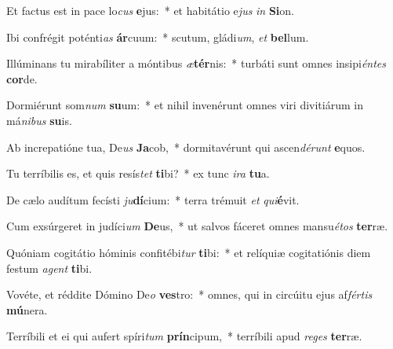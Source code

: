 \item Et factus est in pace lo\textit{cus} \textbf{e}jus:~* et habitátio e\textit{jus} \textit{in} \textbf{Si}on.
\item Ibi confrégit poténti\textit{as} \textbf{ár}cuum:~* scutum, gládi\textit{um}, \textit{et} \textbf{bel}lum.
\item Illúminans tu mirabíliter a móntibus \textit{æ}\textbf{tér}nis:~* turbáti sunt omnes insipi\textit{én}\textit{tes} \textbf{cor}de.
\item Dormiérunt som\textit{num} \textbf{su}um:~* et nihil invenérunt omnes viri divitiárum in má\textit{ni}\textit{bus} \textbf{su}is.
\item Ab increpatióne tua, De\textit{us} \textbf{Ja}cob,~* dormitavérunt qui ascen\textit{dé}\textit{runt} \textbf{e}quos.
\item Tu terríbilis es, et quis resís\textit{tet} \textbf{ti}bi?~* ex tunc \textit{i}\textit{ra} \textbf{tu}a.
\item De cælo audítum fecísti \textit{ju}\textbf{dí}cium:~* terra trémuit \textit{et} \textit{qui}\textbf{é}vit.
\item Cum exsúrgeret in judíci\textit{um} \textbf{De}us,~* ut salvos fáceret omnes mansu\textit{é}\textit{tos} \textbf{ter}ræ.
\item Quóniam cogitátio hóminis confitébi\textit{tur} \textbf{ti}bi:~* et relíquiæ cogitatiónis diem festum \textit{a}\textit{gent} \textbf{ti}bi.
\item Vovéte, et réddite Dómino De\textit{o} \textbf{ves}tro:~* omnes, qui in circúitu ejus af\textit{fér}\textit{tis} \textbf{mú}nera.
\item Terríbili et ei qui aufert spíri\textit{tum} \textbf{prín}cipum,~* terríbili apud \textit{re}\textit{ges} \textbf{ter}ræ.

